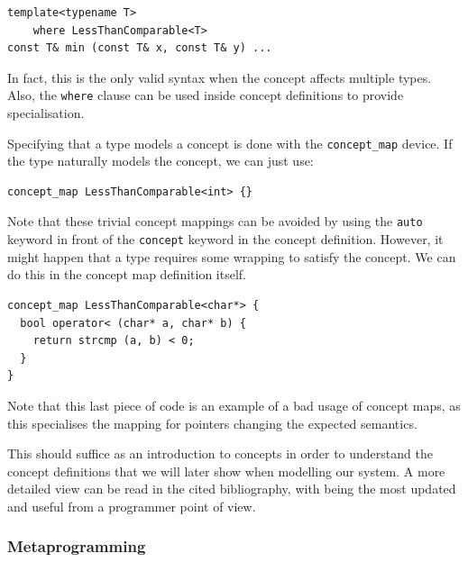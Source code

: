 \begin{lstlisting}
template<typename T>
    where LessThanComparable<T>
const T& min (const T& x, const T& y) ...
\end{lstlisting}

In fact, this is the only valid syntax when the concept affects
multiple types. Also, the \texttt{where} clause can be used inside
concept definitions to provide specialisation.

Specifying that a type models a concept is done with the
\texttt{concept\_map} device. If the type naturally models the
concept, we can just use:

\begin{lstlisting}
concept_map LessThanComparable<int> {}
\end{lstlisting}

Note that these trivial concept mappings can be avoided by using the
\texttt{auto} keyword in front of the \texttt{concept} keyword in the
concept definition. However, it might happen that a type requires some
wrapping to satisfy the concept. We can do this in the concept map
definition itself.

\begin{lstlisting}
concept_map LessThanComparable<char*> {
  bool operator< (char* a, char* b) {
    return strcmp (a, b) < 0;
  }
}
\end{lstlisting}

Note that this last piece of code is an example of a bad usage of
concept maps, as this specialises the mapping for pointers changing
the expected semantics.

This should suffice as an introduction to concepts in order to
understand the concept definitions that we will later show when
modelling our system. A more detailed view can be read in the cited
bibliography, with \cite{jarvi10concept} being the most updated and
useful from a programmer point of view.

\subsubsection{Metaprogramming}

